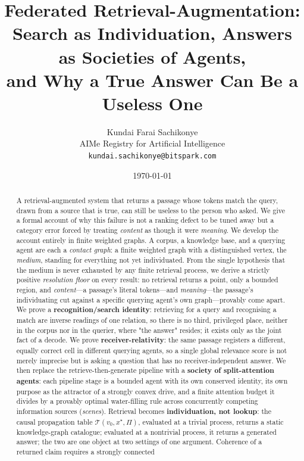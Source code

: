 \documentclass[11pt,twocolumn,a4paper]{article}
\title{\textbf{Federated Retrieval-Augmentation:\\[3pt]
Search as Individuation, Answers as Societies of Agents,\\
and Why a True Answer Can Be a Useless One}}
\author{%
Kundai Farai Sachikonye\\
\small AIMe Registry for Artificial Intelligence\\
\small \texttt{kundai.sachikonye@bitspark.com}}
\date{\today}
\theoremstyle{frathm}
\theoremstyle{definition}
\theoremstyle{remark}
\newcommand{\Tab}{\mathcal{T}}
\newcommand{\Proc}{\Pi}
\begin{document}
\maketitle

\begin{abstract}
\noindent
A retrieval-augmented system that returns a passage whose tokens match
the query, drawn from a source that is true, can still be useless to the
person who asked. We give a formal account of why this failure is not a
ranking defect to be tuned away but a category error forced by treating
\emph{content} as though it were \emph{meaning}. We develop the account
entirely in finite weighted graphs. A corpus, a knowledge base, and a
querying agent are each a \emph{contact graph}: a finite weighted graph
with a distinguished vertex, the \emph{medium}, standing for everything
not yet individuated. From the single hypothesis that the medium is never
exhausted by any finite retrieval process, we derive a strictly positive
\emph{resolution floor} on every result: no retrieval returns a point, only
a bounded region, and \emph{content}---a passage's literal tokens---and
\emph{meaning}---the passage's individuating cut against a specific
querying agent's own graph---provably come apart. We prove a
\textbf{recognition/search identity}: retrieving for a query and
recognising a match are inverse readings of one relation, so there is no
third, privileged place, neither in the corpus nor in the querier, where
"the answer" resides; it exists only as the joint fact of a decode. We
prove \textbf{receiver-relativity}: the same passage registers a different,
equally correct cell in different querying agents, so a single global
relevance score is not merely imprecise but is asking a question that has
no receiver-independent answer. We then replace the retrieve-then-generate
pipeline with a \textbf{society of split-attention agents}: each pipeline
stage is a bounded agent with its own conserved identity, its own purpose
as the attractor of a strongly convex drive, and a finite attention budget
it divides by a provably optimal water-filling rule across concurrently
competing information sources (\emph{scenes}). Retrieval becomes
\textbf{individuation, not lookup}: the causal propagation table
$\Tab(v_0,x^{\star},\Proc)$, evaluated at a trivial process, returns a
static knowledge-graph catalogue; evaluated at a nontrivial process, it
returns a generated answer; the two are one object at two settings of one
argument. Coherence of a returned claim requires a strongly connected

\end{abstract}
\end{document}
